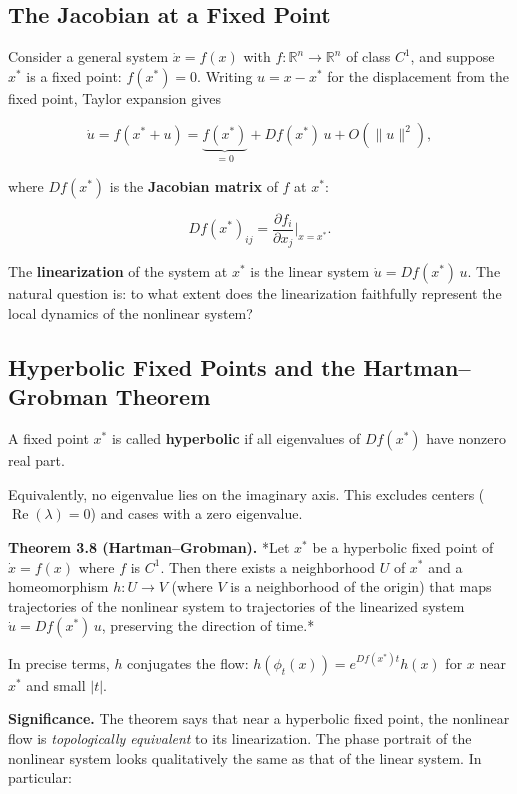 \subsection{The Jacobian at a Fixed Point}\label{sec:3.5.1}

Consider a general system $\dot{x} = f(x)$ with $f: \mathbb{R}^n \to \mathbb{R}^n$ of class $C^1$, and suppose $x^*$ is a fixed point: $f(x^*) = 0$. Writing $u = x - x^*$ for the displacement from the fixed point, Taylor expansion gives

\[
\dot{u} = f(x^* + u) = \underbrace{f(x^*)}_{=0} + Df(x^*)\, u + O(\|u\|^2),
\]

where $Df(x^*)$ is the \textbf{Jacobian matrix} of $f$ at $x^*$:

\[
Df(x^*)_{ij} = \frac{\partial f_i}{\partial x_j}\bigg|_{x = x^*}.
\]

The \textbf{linearization} of the system at $x^*$ is the linear system $\dot{u} = Df(x^*)\, u$. The natural question is: to what extent does the linearization faithfully represent the local dynamics of the nonlinear system?

\subsection{Hyperbolic Fixed Points and the Hartman--Grobman Theorem}\label{sec:3.5.2}

\begin{definition}\label{def:3.7.}
A fixed point $x^*$ is called \textbf{hyperbolic} if all eigenvalues of $Df(x^*)$ have nonzero real part.

Equivalently, no eigenvalue lies on the imaginary axis. This excludes centers ($\operatorname{Re}(\lambda) = 0$) and cases with a zero eigenvalue.
\end{definition}


\textbf{Theorem 3.8 (Hartman--Grobman).} *Let $x^*$ be a hyperbolic fixed point of $\dot{x} = f(x)$ where $f$ is $C^1$. Then there exists a neighborhood $U$ of $x^*$ and a homeomorphism $h: U \to V$ (where $V$ is a neighborhood of the origin) that maps trajectories of the nonlinear system to trajectories of the linearized system $\dot{u} = Df(x^*)\,u$, preserving the direction of time.*

In precise terms, $h$ conjugates the flow: $h(\phi_t(x)) = e^{Df(x^*)t} h(x)$ for $x$ near $x^*$ and small $|t|$.

\textbf{Significance.} The theorem says that near a hyperbolic fixed point, the nonlinear flow is \textit{topologically equivalent} to its linearization. The phase portrait of the nonlinear system looks qualitatively the same as that of the linear system. In particular:

